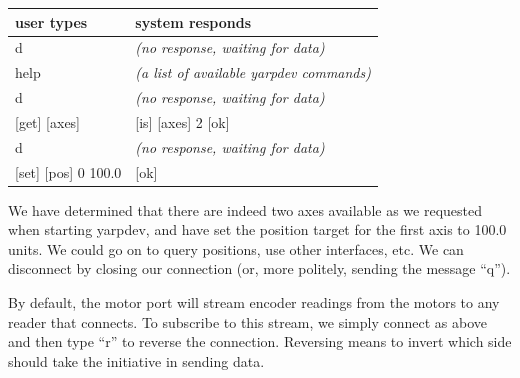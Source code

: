 \begin{center}
\begin{tabular}{ll}
\hline\hline
{\bf user types} & {\bf system responds} \\
\hline
 d & {\it (no response, waiting for data)} \\
 help & {\it (a list of available yarpdev commands)} \\
 d & {\it (no response, waiting for data)} \\
 {[get] [axes]} &  {[is] [axes] 2 [ok]} \\
 d & {\it (no response, waiting for data)} \\
 {[set] [pos] 0 100.0} & {[ok]} \\
\hline\hline
\end{tabular}
\end{center}

We have determined that there are indeed two axes available as we requested
when starting yarpdev, and have set the position target for the
first axis to 100.0 units.  We could go on to query positions, use
other interfaces, etc.  We can disconnect by closing our connection
(or, more politely, sending the message ``q'').

By default, the motor port will stream encoder readings from the motors
to any reader that connects.  To subscribe to this stream, we simply
connect as above and then type ``r'' to reverse the connection.
Reversing means to invert which side should take the initiative
in sending data.





